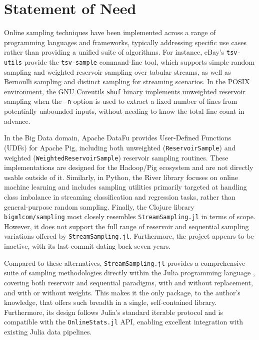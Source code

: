 \documentclass{juliacon}
\begin{document}
\section{Statement of Need}

Online sampling techniques have been implemented across a range of programming languages and frameworks, typically addressing specific use cases rather than providing a unified suite of algorithms. For instance, eBay's \texttt{tsv-utils} provide the \texttt{tsv-sample} command-line tool, which supports simple random sampling and weighted reservoir sampling over tabular streams, as well as Bernoulli sampling and distinct sampling for streaming scenarios. In the POSIX environment, the GNU Coreutils \texttt{shuf} binary \cite{gnucoreutilsshuf} implements unweighted reservoir sampling when the \texttt{-n} option is used to extract a fixed number of lines from potentially unbounded inputs, without needing to know the total line count in advance.

In the Big Data domain, Apache DataFu \cite{sumbaly2013datafu} provides User-Defined Functions (UDFs) for Apache Pig, including both unweighted (\texttt{ReservoirSample}) and weighted (\texttt{WeightedReservoirSample}) reservoir sampling routines. These implementations are designed for the Hadoop/Pig ecosystem and are not directly usable outside of it. Similarly, in Python, the River library \cite{montiel2021river} focuses on online machine learning and includes sampling utilities primarily targeted at handling class imbalance in streaming classification and regression tasks, rather than general-purpose random sampling. Finally, the Clojure library \texttt{bigmlcom/sampling} most closely resembles \texttt{StreamSampling.jl} in terms of scope. However, it does not support the full range of reservoir and sequential sampling variations offered by \texttt{StreamSampling.jl}. Furthermore, the project appears to be inactive, with its last commit dating back seven years.

Compared to these alternatives, \texttt{StreamSampling.jl} provides a comprehensive suite of sampling methodologies directly within the Julia programming language \cite{bezanson2017julia}, covering both reservoir and sequential paradigms, with and without replacement, and with or without weights. This makes it the only package, to the author's knowledge, that offers such breadth in a single, self-contained library. Furthermore, its design follows Julia's standard iterable protocol and is compatible with the \texttt{OnlineStats.jl} \cite{day2020onlinestats} API, enabling excellent integration with existing Julia data pipelines.
\end{document}
